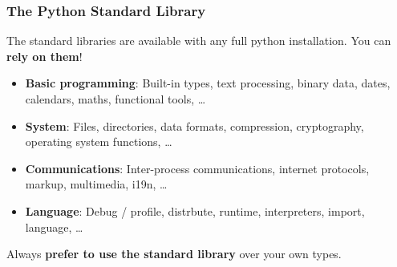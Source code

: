 \documentclass{beamer} %
\newcommand\emc[1]{\textcolor{brightblue}{\textbf{#1}}}
\begin{document}

\begin{frame}

\frametitle{The Python Standard Library}

The standard libraries are available with any full python installation. You can \emc{rely on them}!
\begin{itemize}
  \item \emc{Basic programming}: Built-in types, text processing, binary data, dates, calendars, maths, functional tools, \ldots
  \item \emc{System}: Files, directories, data formats, compression, cryptography, operating system functions, \ldots
  \item \emc{Communications}: Inter-process communications, internet protocols, markup, multimedia, i19n, \ldots
  \item \emc{Language}: Debug / profile, distrbute, runtime, interpreters, import, language, \ldots
  \end{itemize}

Always \emc{prefer to use the standard library} over your own types.

\end{frame}
\end{document}
